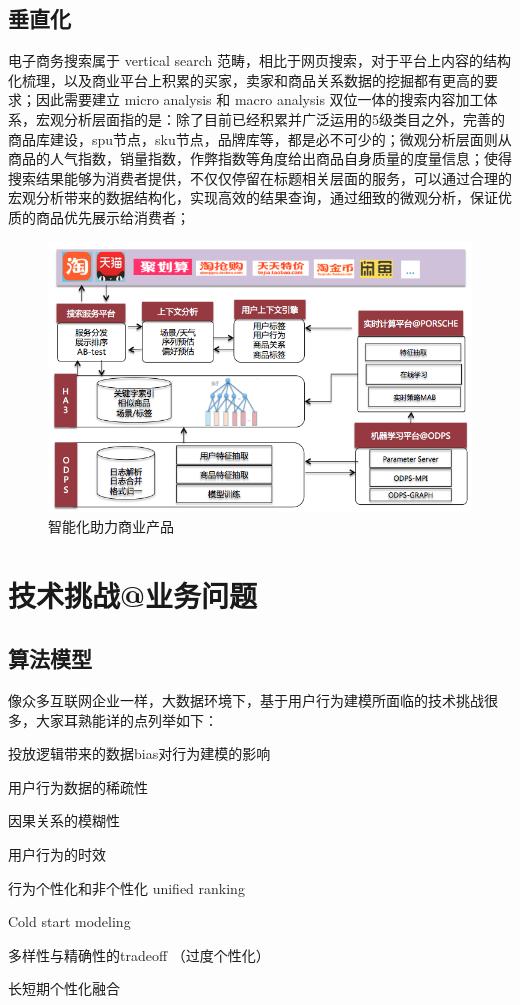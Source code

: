 \subsection{垂直化}
电子商务搜索属于 vertical search 范畴，相比于网页搜索，对于平台上内容的结构化梳理，以及商业平台上积累的买家，卖家和商品关系数据的挖掘都有更高的要求；因此需要建立 micro analysis 和 macro analysis 双位一体的搜索内容加工体系，宏观分析层面指的是：除了目前已经积累并广泛运用的5级类目之外，完善的商品库建设，spu节点，sku节点，品牌库等，都是必不可少的；微观分析层面则从商品的人气指数，销量指数，作弊指数等角度给出商品自身质量的度量信息；使得搜索结果能够为消费者提供，不仅仅停留在标题相关层面的服务，可以通过合理的宏观分析带来的数据结构化，实现高效的结果查询，通过细致的微观分析，保证优质的商品优先展示给消费者；


\begin{figure}[h]
\centering
\includegraphics[totalheight=3.0in]{fig/techForBusiness.png}
\caption{智能化助力商业产品} \label{fig:gansamples}
\end{figure}

\section{技术挑战@业务问题} 
\subsection{算法模型} 
像众多互联网企业一样，大数据环境下，基于用户行为建模所面临的技术挑战很多，大家耳熟能详的点列举如下： 
\begin{description}
	\item 投放逻辑带来的数据bias对行为建模的影响
	\item 用户行为数据的稀疏性
	\item 因果关系的模糊性
	\item 用户行为的时效
	\item 行为个性化和非个性化 unified ranking
	\item Cold start modeling
	\item 多样性与精确性的tradeoff （过度个性化）
	\item 长短期个性化融合
\end{description}

